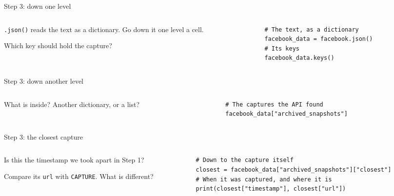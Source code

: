 \documentclass[9pt,aspectratio=169]{beamer}
\begin{document}
\begin{frame}[fragile]{Step 3: down one level}
    \begin{columns}[T]
        \begin{column}{0.37\textwidth}
            \texttt{.json()} reads the text as a dictionary. Go down it one level a cell.

            \medskip
            Which key should hold the capture?
        \end{column}
        \begin{column}{0.6\textwidth}
\begin{lstlisting}
# The text, as a dictionary
facebook_data = facebook.json()
# Its keys
facebook_data.keys()
\end{lstlisting}
        \end{column}
    \end{columns}
\end{frame}

\begin{frame}[fragile]{Step 3: down another level}
    \begin{columns}[T]
        \begin{column}{0.37\textwidth}
            What is inside? Another dictionary, or a list?
        \end{column}
        \begin{column}{0.6\textwidth}
\begin{lstlisting}
# The captures the API found
facebook_data["archived_snapshots"]
\end{lstlisting}
        \end{column}
    \end{columns}
\end{frame}

\begin{frame}[fragile]{Step 3: the closest capture}
    \begin{columns}[T]
        \begin{column}{0.37\textwidth}
            Is this the timestamp we took apart in Step 1?

            \medskip
            Compare its \texttt{url} with \texttt{CAPTURE}. What is different?
        \end{column}
        \begin{column}{0.6\textwidth}
\begin{lstlisting}
# Down to the capture itself
closest = facebook_data["archived_snapshots"]["closest"]
# When it was captured, and where it is
print(closest["timestamp"], closest["url"])
\end{lstlisting}
        \end{column}
    \end{columns}
\end{frame}
\end{document}
